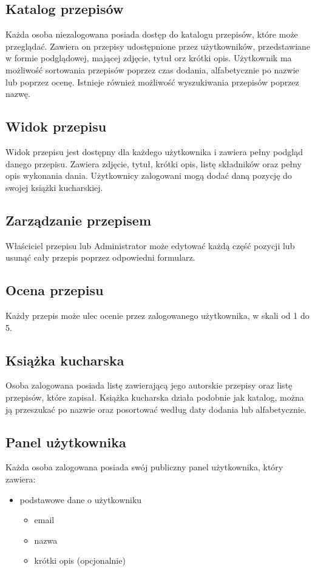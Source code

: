 \documentclass[11pt]{article}
\begin{document}
  \subsection{Katalog przepisów}
    Każda osoba niezalogowana posiada dostęp do katalogu przepisów, które może przeglądać. Zawiera on przepisy udostępnione przez użytkowników, przedstawiane w formie podglądowej, mającej zdjęcie, tytuł orz krótki opis. Użytkownik ma możliwość sortowania przepisów poprzez czas dodania, alfabetycznie po nazwie lub poprzez ocenę.
    Istnieje również możliwość wyszukiwania przepisów poprzez nazwę.
    
  \subsection{Widok przepisu}
  Widok przepisu jest dostępny dla każdego użytkownika i zawiera pełny podgląd danego przepisu. Zawiera zdjęcie, tytuł, krótki opis, listę składników oraz pełny opis wykonania dania.
  Użytkownicy zalogowani mogą dodać daną pozycję do swojej książki kucharskiej.
  
  \subsection{Zarządzanie przepisem}
  Właściciel przepisu lub Administrator może edytować każdą część pozycji lub usunąć cały przepis poprzez odpowiedni formularz.
  
   \subsection{Ocena przepisu}
  Każdy przepis może ulec ocenie przez zalogowanego użytkownika, w skali od 1 do 5.
  \subsection{Książka kucharska}
  Osoba zalogowana posiada listę zawierającą jego autorskie przepisy oraz listę przepisów, które zapisał. Książka kucharska działa podobnie jak katalog, można ją przeszukać po nazwie oraz posortować według daty dodania lub alfabetycznie.

  \subsection{Panel użytkownika}
  Każda osoba zalogowana posiada swój publiczny panel użytkownika, który zawiera:
  \begin{itemize}
    \item podstawowe dane o użytkowniku
    \begin{itemize}
        \item email
        \item nazwa
        \item krótki opis (opcjonalnie)
    \end{itemize}
  \end{itemize}
\end{document}
